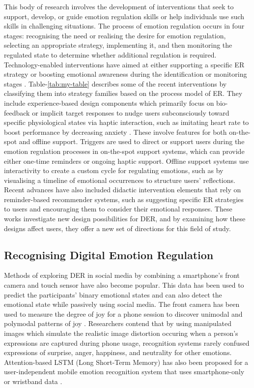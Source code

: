 This body of research involves the development of interventions that seek to support, develop, or guide emotion regulation skills or help individuals use such skills in challenging situations. The process of emotion regulation occurs in four stages: recognising the need or realising the desire for emotion regulation, selecting an appropriate strategy, implementing it, and then monitoring the regulated state to determine whether additional regulation is required. Technology-enabled interventions have aimed at either supporting a specific ER strategy or boosting emotional awareness during the identification or monitoring stages \cite{slovak2022designing}. 
Table-\ref{tab:my-table} describes some of the recent interventions by classifying them into strategy families based on the process model of ER.
They include experience-based design components which primarily focus on bio-feedback or implicit target responses to nudge users subconsciously toward specific physiological states via haptic interaction, such as imitating heart rate to boost performance by decreasing anxiety \cite{smith2022digital}. These involve features for both on-the-spot and offline support. Triggers are used to direct or support users during the emotion regulation processes in on-the-spot support systems, which can provide either one-time reminders or ongoing haptic support. Offline support systems use interactivity to create a custom cycle for regulating emotions, such as by visualising a timeline of emotional occurrences to structure users' reflections. Recent advances have also included didactic intervention elements that rely on reminder-based recommender systems, such as suggesting specific ER strategies to users and encouraging them to consider their emotional responses. These works investigate new design possibilities for DER, and by examining how these designs affect users, they offer a new set of directions for this field of study.
\vspace{-0.15cm}
\subsection{Recognising Digital Emotion Regulation}
Methods of exploring DER in social media by combining a smartphone's front camera and touch sensor have also become popular. This data has been used to predict the participants' binary emotional states and can also detect the emotional state while passively using social media. The front camera has been used to measure the degree of joy for a phone session to discover unimodal and polymodal patterns of joy \cite{tag2022emotion}. Researchers contend that by using manipulated images which simulate the realistic image distortion occuring when a person's expressions are captured during phone usage, recognition systems rarely confused expressions of surprise, anger, happiness, and neutrality for other emotions. Attention-based LSTM (Long Short-Term Memory) has also been proposed for a user-independent mobile emotion recognition system that uses smartphone-only or wristband data \cite{yang2021behavioral}.


